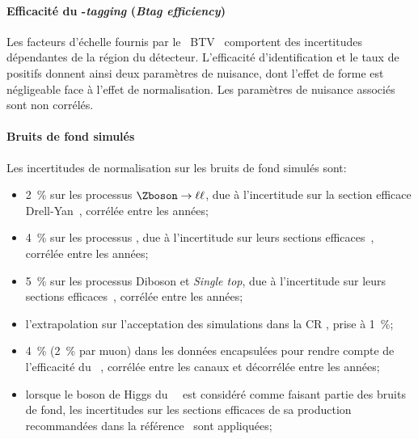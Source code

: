 \paragraph{Efficacité du \quarkb-\emph{tagging} (\emph{Btag efficiency})}
Les facteurs d'échelle fournis par le \POG\ BTV~\cite{BTV} comportent des incertitudes dépendantes de la région du détecteur.
L'efficacité d'identification et le taux de positifs donnent ainsi deux paramètres de nuisance, dont l'effet de forme est négligeable face à l'effet de normalisation.
Les paramètres de nuisance associés sont non corrélés.
\paragraph{Bruits de fond simulés}
Les incertitudes de normalisation sur les bruits de fond simulés sont:
\begin{itemize}
\item \SI{2}{\%} sur les processus $\Zboson\to\ell\ell$, due à l'incertitude sur la section efficace Drell-Yan~\cite{CMSxsec}, corrélée entre les années;
\item \SI{4}{\%} sur les processus \Wjets, due à l'incertitude sur leurs sections efficaces~\cite{CMSxsec}, corrélée entre les années;
\item \SI{5}{\%} sur les processus Diboson et \emph{Single top}, due à l'incertitude sur leurs sections efficaces~\cite{CMSxsec}, corrélée entre les années;
\item l'extrapolation sur l'acceptation des simulations dans la CR \ttbar, prise à \SI{1}{\%};
\item \SI{4}{\%} (\SI{2}{\%} par muon) dans les données encapsulées pour rendre compte de l'efficacité du \HLTpath\ \HLTDoubleMu, corrélée entre les canaux et décorrélée entre les années;
\item lorsque le boson de Higgs du \SM\ \higgs\ est considéré comme faisant partie des bruits de fond, les incertitudes sur les sections efficaces de sa production recommandées dans la référence~\cite{Higgs_xsec_book_4} sont appliquées;
\end{itemize}
